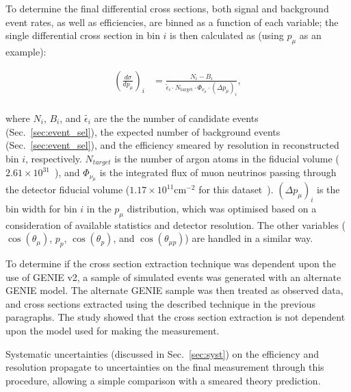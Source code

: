 To determine the final differential cross sections, both signal and background event rates, as well as efficiencies, are binned as a function of each variable; the single differential cross section in bin $i$ is then calculated as (using $p_\mu$ as an example):

\begin{equation}
\label{eq:xsec_differential}
\begin{split}
\left ( \frac{d\sigma}{dp_\mu} \right )_i &= \frac{N_i - B_i}{\tilde{\epsilon}_i \cdot N_\text{target} \cdot \Phi_{\nu_\mu} \cdot (\Delta p_\mu)_i}, \\
\end{split}
\end{equation}

\noindent
where $N_i$, $B_i$, and $\tilde{\epsilon_i}$ are the the number of candidate events (Sec.~\ref{sec:event_sel}), the expected number of background events (Sec.~\ref{sec:event_sel}), and the efficiency smeared by resolution in reconstructed bin $i$, respectively. 
$N_{target}$ is the number of argon atoms in the fiducial volume ($2.61 \times 10^{31}$~\cite{Adams:2019iqcINCL}), and $\Phi_{\nu_\mu}$ is the integrated flux of muon neutrinos passing through the detector fiducial volume ($1.17 \times 10^{11}  \text{cm}^{-2}$ for this dataset~\cite{Adams:2019iqcINCL}). 
$(\Delta p_\mu)_i$ is the bin width for bin $i$ in the $p_\mu$ distribution, which was optimised based on a consideration of available statistics and detector resolution.
The other variables ($\cos(\theta_\mu)$, $p_p$, $\cos(\theta_p)$, and $\cos(\theta_{\mu p})$) are handled in a similar way.

To determine if the cross section extraction technique was dependent upon the use of GENIE v2, a sample of simulated events was generated with an alternate GENIE model. The alternate GENIE sample was then treated as observed data, and cross sections extracted using the described technique in the previous paragraphs. The study showed that the cross section extraction is not dependent upon the model used for making the measurement.

Systematic uncertainties (discussed in Sec.~\ref{sec:syst}) on the efficiency and resolution propagate to uncertainties on the final measurement through this procedure, allowing a simple comparison with a smeared theory prediction.




